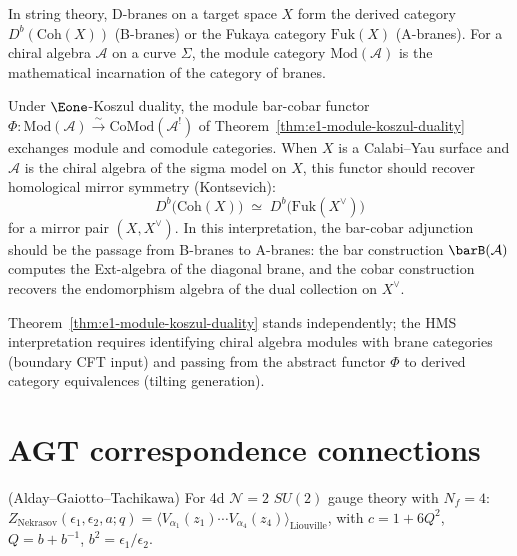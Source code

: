 \begin{conjecture}
In string theory, D-branes on a target space $X$ form the derived category
$D^b(\mathrm{Coh}(X))$ (B-branes) or the Fukaya category $\mathrm{Fuk}(X)$
(A-branes).  For a chiral algebra $\mathcal{A}$ on a curve $\Sigma$, the
module category $\mathrm{Mod}(\mathcal{A})$ is the mathematical incarnation
of the category of branes.

Under $\Eone$-Koszul duality, the module bar-cobar functor
$\Phi\colon \mathrm{Mod}(\mathcal{A}) \xrightarrow{\sim}
\mathrm{CoMod}(\mathcal{A}^!)$
of Theorem~\ref*{thm:e1-module-koszul-duality} exchanges module and comodule
categories.  When $X$ is a Calabi--Yau surface and $\mathcal{A}$ is the chiral
algebra of the sigma model on $X$, this functor should recover homological
mirror symmetry (Kontsevich):
\[
D^b\bigl(\mathrm{Coh}(X)\bigr)
\;\simeq\;
D^b\bigl(\mathrm{Fuk}(X^\vee)\bigr)
\]
for a mirror pair $(X, X^\vee)$.  In this interpretation, the bar-cobar
adjunction should be the passage from B-branes to A-branes: the bar construction
$\barB(\mathcal{A})$ computes the Ext-algebra of the diagonal brane,
and the cobar construction recovers the endomorphism algebra of the dual
collection on $X^\vee$.
\end{conjecture}

\begin{remark}[Scope]
Theorem~\ref*{thm:e1-module-koszul-duality} stands independently; the HMS interpretation requires identifying chiral algebra modules with brane categories (boundary CFT input) and passing from the abstract functor $\Phi$ to derived category equivalences (tilting generation).
\end{remark}


\section{AGT correspondence connections}

\begin{theorem}%
(Alday--Gaiotto--Tachikawa) For 4d $\mathcal{N}=2$ $SU(2)$ gauge theory with $N_f=4$: $Z_{\mathrm{Nekrasov}}(\epsilon_1,\epsilon_2,a;q) = \langle V_{\alpha_1}(z_1)\cdots V_{\alpha_4}(z_4)\rangle_{\mathrm{Liouville}}$, with $c = 1+6Q^2$, $Q=b+b^{-1}$, $b^2=\epsilon_1/\epsilon_2$.
\end{theorem}

